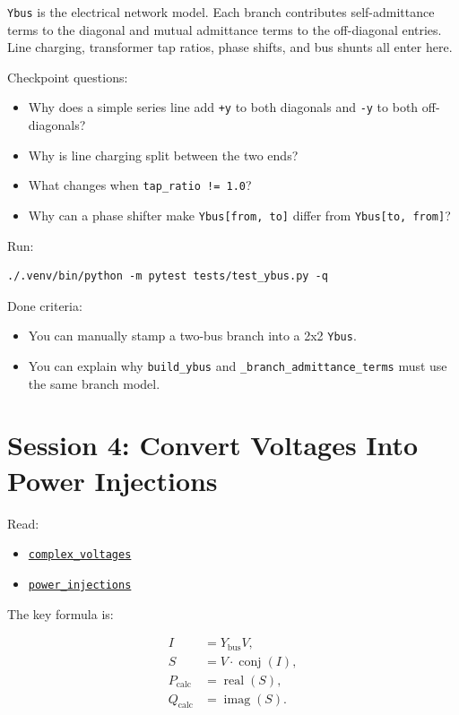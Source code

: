 \documentclass[11pt]{article}
\newcommand{\code}[1]{\texttt{#1}}
\begin{document}
\code{Ybus} is the electrical network model. Each branch contributes
self-admittance terms to the diagonal and mutual admittance terms to the
off-diagonal entries. Line charging, transformer tap ratios, phase shifts, and
bus shunts all enter here.

Checkpoint questions:

\begin{itemize}
  \item Why does a simple series line add \code{+y} to both diagonals and
  \code{-y} to both off-diagonals?
  \item Why is line charging split between the two ends?
  \item What changes when \code{tap\_ratio != 1.0}?
  \item Why can a phase shifter make \code{Ybus[from, to]} differ from
  \code{Ybus[to, from]}?
\end{itemize}

Run:

\begin{verbatim}
./.venv/bin/python -m pytest tests/test_ybus.py -q
\end{verbatim}

Done criteria:

\begin{itemize}
  \item You can manually stamp a two-bus branch into a 2x2 \code{Ybus}.
  \item You can explain why \code{build\_ybus} and
  \code{\_branch\_admittance\_terms} must use the same branch model.
\end{itemize}

\section{Session 4: Convert Voltages Into Power Injections}

Read:

\begin{itemize}
  \item \href{../src/powerflow/flows.py\#L35}{\code{complex\_voltages}}
  \item \href{../src/powerflow/solver.py\#L36}{\code{power\_injections}}
\end{itemize}

The key formula is:

\begin{align*}
I &= Y_{\mathrm{bus}} V, \\
S &= V \cdot \operatorname{conj}(I), \\
P_{\mathrm{calc}} &= \operatorname{real}(S), \\
Q_{\mathrm{calc}} &= \operatorname{imag}(S).
\end{align*}
\end{document}
